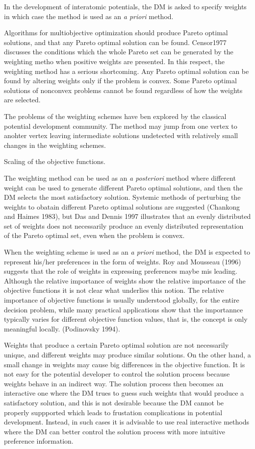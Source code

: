   In the development of interatomic potentials, the DM is asked to specify weights in which case the method is used as an \emph{a priori} method.

Algorithms for multiobjective optimization should produce Pareto optimal solutions, and that any Pareto optimal solution can be found.  Censor1977 discusses the conditions which the whole Pareto set can be generated by the weighting metho when positive weights are presented.  In this respect, the weighting method has a serious shortcoming.  Any Pareto optimal solution can be found by altering weights only if the problem is convex.  Some Pareto optimal solutions of nonconvex problems cannot be found regardless of how the weights are selected.

The problems of the weighting schemes have ben explored by the classical potential development community.  The method may jump from one vertex to anohter vertex leaving intermediate solutions undetected with relatively small changes in the weighting schemes.

Scaling of the objective functions.

The weighting method can be used as an \emph{a posteriori} method where different weight can be used to generate different Pareto optimal solutions, and then the DM selects the most satisfactory solution.  Systemic methods of perturbing the weights to obatain different Pareto optimal solutions are suggested (Chankong and Haimes 1983), but Das and Dennis 1997 illustrates that an evenly distributed set of weights does not necessarily produce an evenly distributed representation of the Pareto optimal set, even when the problem is convex.

When the weighting scheme is used as an \emph{a priori} method, the DM is expected to represent his/her preferences in the form of weights.  Roy and Mousseau (1996) suggests that the role of weights in expressing preferences maybe mis leading.  Although the relative importance of weights show the relative importance of the objective functions it is not clear what underlies this notion.  The relative importance of objective functions is usually understood globally, for the entire decision problem, while many practical applications show that the importannce typically varies for different objective function values, that is, the concept is only meaningful locally. (Podinovsky 1994).

Weights that produce a certain Pareto optimal solution are not necessarily unique, and different weights may produce similar solutions.  On the other hand, a small change in weights may cause big differences in the objective function.  It is not easy for the potential developer to control the solution process because weights behave in an indirect way.  The solution process then becomes an interactive one where the DM trues to guess such weights that would produce a satisfactory solution, and this is not desirable because the DM cannot be properly suppported which leads to frustation complications in potential development.  Instead, in such cases it is advisable to use real interactive methods where the DM can better control the solution process with more intuitive preference information.

